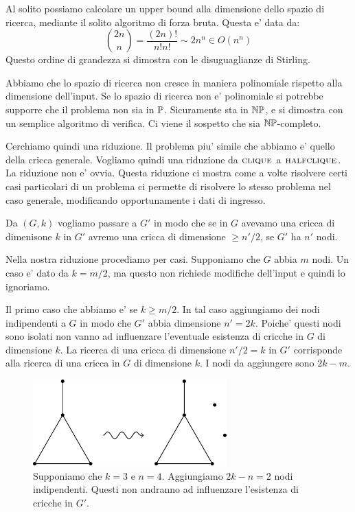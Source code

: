 Al solito possiamo calcolare un upper bound alla dimensione dello spazio di ricerca, mediante il
solito algoritmo di forza bruta. Questa e' data da:
\begin{equation*}
    \binom{2n}{n} = \frac{(2n)!}{n!n!} \sim 2n^{n} \in O(n^{n})
\end{equation*}
Questo ordine di grandezza si dimostra con le disuguaglianze di Stirling.

Abbiamo che lo spazio di ricerca non cresce in maniera polinomiale rispetto alla dimensione
dell'input. Se lo spazio di ricerca non e' polinomiale si potrebbe supporre che il problema non sia
in $\mathbb{P}$. Sicuramente sta in $\mathbb{NP}$, e si dimostra con un semplice algoritmo di verifica. Ci
viene il sospetto che sia $\mathbb{NP}$-completo.

Cerchiamo quindi una riduzione. Il problema piu' simile che abbiamo e' quello della cricca generale.
Vogliamo quindi una riduzione da $\textsc{clique}$ a $\textsc{halfclique}$. La riduzione non e' ovvia. Questa
riduzione ci mostra come a volte risolvere certi casi particolari di un problema ci permette di
risolvere lo stesso problema nel caso generale, modificando opportunamente i dati di ingresso.

Da $(G,k)$ vogliamo passare a $G'$ in modo che se in $G$ avevamo una cricca di dimenisone $k$ in
$G'$ avremo una cricca di dimensione $\geq n'/2$, se $G'$ ha $n'$ nodi.

Nella nostra riduzione procediamo per casi. Supponiamo che $G$ abbia $m$ nodi. Un caso e' dato da $k
= m/2$, ma questo non richiede modifiche dell'input e quindi lo ignoriamo.

Il primo caso che abbiamo e' se $k \geq m/2$.  In tal caso aggiungiamo dei nodi indipendenti a $G$
in modo che $G'$ abbia dimensione $n' = 2k$. Poiche' questi nodi sono isolati non vanno ad
influenzare l'eventuale esistenza di cricche in $G$ di dimensione $k$. La ricerca di una cricca di
dimensione $n'/2 = k$ in $G'$ corrisponde alla ricerca di una cricca in $G$ di dimensione $k$. I
nodi da aggiungere sono $2k - m$.

\begin{figure}[h]
    \begin{center}
        \includegraphics{./img/NPClass/CLIHCLI1.pdf}
        \caption{Supponiamo che $k=3$ e $n=4$. Aggiungiamo $2k-n = 2$ nodi indipendenti. Questi non
        andranno ad influenzare l'esistenza di cricche in $G'$.}
    \end{center}
\end{figure}

